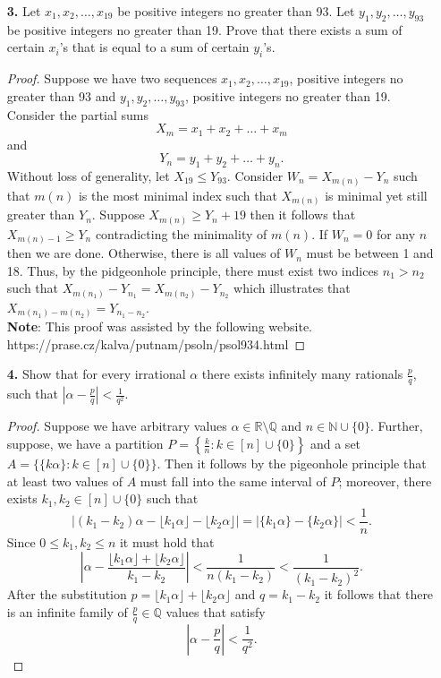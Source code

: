 \documentclass[ 12pt ]{article}
\begin{document}
\begin{enumerate}
	\item[\textbf{3.}] Let $x_1, x_2, \hdots, x_{19}$ be positive integers no greater than 93. Let $y_1, y_2, \hdots, y_{93}$ be positive integers no greater than 19. Prove that there
		exists a sum of certain $x_i$’s that is equal to a sum of certain $y_i$’s.

		\begin{proof}
			Suppose we have two sequences $x_1, x_2, \hdots, x_{19}$, positive integers no greater than 93 and $y_1, y_2, \hdots, y_{93}$, positive integers no greater than 19.
			Consider the partial sums $$X_m =  x_1 + x_2 + \hdots + x_m$$ and $$Y_n =  y_1 + y_2 + \hdots + y_n.$$ Without loss of generality, let $X_{19} \leq Y_{93}$. Consider
			$W_n = X_{m(n)} - Y_n$ such that $m(n)$ is the most minimal index such that $X_{m(n)}$ is minimal yet still greater than $Y_n$. Suppose $X_{m(n)} \geq Y_n + 19$ then
			it follows that $X_{m(n)-1} \geq Y_n$ contradicting the minimality of $m(n)$. If $W_n = 0$ for any $n$ then we are done. Otherwise, there is all values of $W_n$ must
			be between 1 and 18. Thus, by the pidgeonhole principle, there must exist two indices $n_1 > n_2$ such that $X_{m(n_1)} - Y_{n_1} = X_{m(n_2)} - Y_{n_2}$ which illustrates
			that $X_{m(n_1) - m(n_2)} = Y_{n_1 - n_2}$. \\
			\textbf{Note}: This proof was assisted by the following website. https://prase.cz/kalva/putnam/psoln/psol934.html
		\end{proof}


	\item[\textbf{4.}] Show that for every irrational $\alpha$ there exists infinitely many rationals $\frac{p}{q}$, such that $\left | \alpha - \frac{p}{q} \right | < \frac{1}{q^2}$.

		\begin{proof}
			Suppose we have arbitrary values $\alpha \in \mathbb{R} \setminus \mathbb{Q}$ and $n \in \mathbb{N} \cup \{ 0 \}$. Further, suppose, we have a partition $P = \left \{
			\frac{k}{n} : k \in [n] \cup \{ 0 \} \right \}$ and a set $A = \{ \{ k \alpha \} : k \in [n] \cup \{ 0 \} \}$. Then it follows by the pigeonhole principle that at least
			two values of $A$ must fall into the same interval of $P$; moreover, there exists $k_1, k_2 \in [n] \cup \{ 0 \}$ such that $$|(k_1 - k_2) \alpha - \lfloor k_1 \alpha
			\rfloor - \lfloor k_2 \alpha \rfloor| = |\{ k_1 \alpha \} - \{ k_2 \alpha \}| < \frac{1}{n}.$$ Since $0 \leq k_1, k_2 \leq n$ it must hold that
			$$\left | \alpha - \frac{\lfloor k_1 \alpha \rfloor + \lfloor k_2 \alpha \rfloor}{k_1 - k_2} \right | < \frac{1}{n(k_1 - k_2)} < \frac{1}{(k_1 - k_2)^2}.$$ After the
			substitution $p = \lfloor k_1 \alpha \rfloor + \lfloor k_2 \alpha \rfloor$ and $q = k_1 - k_2$ it follows that there is an infinite family of $\frac{p}{q} \in \mathbb{Q}$
			values that satisfy $$\left | \alpha - \frac{p}{q} \right | < \frac{1}{q^2}.$$
		\end{proof}



\end{enumerate}
\end{document}
